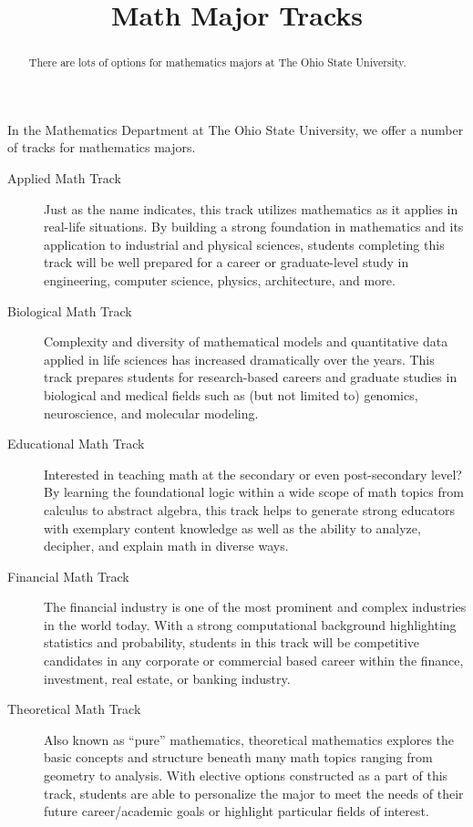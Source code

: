 \documentclass[handout,nooutcomes,space]{ximera}
\title{Math Major Tracks}
\begin{document}
\begin{abstract}
There are lots of options for mathematics majors at The Ohio State University. 
\end{abstract}
\maketitle

In the Mathematics Department at The Ohio State University, we offer a
number of tracks for mathematics majors.

\begin{description}
\item[Applied Math Track] Just as the name indicates, this track
  utilizes mathematics as it applies in real-life situations.  By
  building a strong foundation in mathematics and its application to
  industrial and physical sciences, students completing this track
  will be well prepared for a career or graduate-level study in
  engineering, computer science, physics, architecture, and more.
 
\item[Biological Math Track] Complexity and diversity of mathematical
  models and quantitative data applied in life sciences has increased
  dramatically over the years.  This track prepares students for
  research-based careers and graduate studies in biological and
  medical fields such as (but not limited to) genomics, neuroscience,
  and molecular modeling.
 
\item[Educational Math Track] Interested in teaching math at the
  secondary or even post-secondary level?  By learning the
  foundational logic within a wide scope of math topics from calculus
  to abstract algebra, this track helps to generate strong educators
  with exemplary content knowledge as well as the ability to analyze,
  decipher, and explain math in diverse ways.
 
\item[Financial Math Track] The financial industry is one of the most
  prominent and complex industries in the world today.  With a strong
  computational background highlighting statistics and probability,
  students in this track will be competitive candidates in any
  corporate or commercial based career within the finance, investment,
  real estate, or banking industry.
 
\item[Theoretical Math Track] Also known as ``pure'' mathematics,
  theoretical mathematics explores the basic concepts and structure
  beneath many math topics ranging from geometry to analysis.  With
  elective options constructed as a part of this track, students are
  able to personalize the major to meet the needs of their future
  career/academic goals or highlight particular fields of interest.
\end{description}
\end{document}

